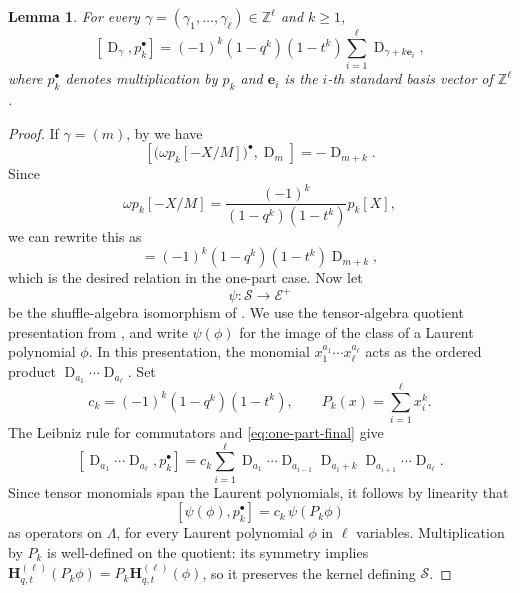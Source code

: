 \documentclass[reqno]{amsart}
\theoremstyle{plain}
\newtheorem{lemma}[theorem]{Lemma}
\theoremstyle{definition}
\theoremstyle{remark}
\DeclareMathOperator{\D}{D}
\newcommand{\Z}{\mathbb{Z}}
\newcommand{\<}{\langle}
\renewcommand{\>}{\rangle}
\begin{document}
\begin{lemma}
    \label{lem:commutator}
    For every $\gamma=(\gamma_1,\dots,\gamma_\ell)\in\Z^\ell$ and $k\geq 1$,
    \begin{equation}        
        \label{eq:commutator}
        [\D_{\gamma}, p_k^\bullet] = (-1)^k (1-q^k)(1-t^k) \sum_{i=1}^{\ell} \D_{\gamma+k\mathbf{e}_i},
    \end{equation}
    where $p_k^\bullet$ denotes multiplication by $p_k$ and $\mathbf{e}_i$ is the $i$-th standard basis vector of $\Z^\ell$.
\end{lemma}

\begin{proof}
    If $\gamma = (m)$, by \cite[Lemma~3.3.3]{BHMPS2023ShuffleAnyLine} we have
    \[ \left[\bigl(\omega p_k[-X/M]\bigr)^\bullet, \D_m \right] = -\D_{m+k}. \]
    Since
    \[ \omega p_k[-X/M] = \frac{(-1)^k}{(1-q^k)(1-t^k)} p_k[X], \]
    we can rewrite this as
    \begin{equation}
        [\D_m, p_k^\bullet] = (-1)^k (1-q^k)(1-t^k) \D_{m+k}, \label{eq:one-part-final}
    \end{equation}
    which is the desired relation in the one-part case. Now let
    \[ \psi \colon \mathcal{S} \longrightarrow \mathcal{E}^+ \]
    be the shuffle-algebra isomorphism of \cite[Proposition~3.5.1]{BHMPS2023ShuffleAnyLine}. We use the tensor-algebra quotient presentation from \cite[Section~3.5]{BHMPS2023ShuffleAnyLine}, and write $\psi(\phi)$ for the image of the class of a Laurent polynomial $\phi$. In this presentation, the monomial $x_1^{a_1}\cdots x_\ell^{a_\ell}$ acts as the ordered product $\D_{a_1}\cdots\D_{a_\ell}$. Set
    \[ c_k=(-1)^k(1-q^k)(1-t^k),\qquad P_k(x)=\sum_{i=1}^\ell x_i^k. \]
    The Leibniz rule for commutators and \eqref{eq:one-part-final} give
    \[
        [\D_{a_1}\cdots\D_{a_\ell},p_k^\bullet]
        =c_k\sum_{i=1}^\ell
        \D_{a_1}\cdots\D_{a_{i-1}}\D_{a_i+k}\D_{a_{i+1}}\cdots\D_{a_\ell}.
    \]
    Since tensor monomials span the Laurent polynomials, it follows by linearity that
    \[ [\psi(\phi),p_k^\bullet]=c_k\,\psi(P_k\phi) \]
    as operators on $\Lambda$, for every Laurent polynomial $\phi$ in $\ell$ variables. Multiplication by $P_k$ is well-defined on the quotient: its symmetry implies
    $\mathbf H_{q,t}^{(\ell)}(P_k\phi)=P_k\mathbf H_{q,t}^{(\ell)}(\phi)$, so it preserves the kernel defining $\mathcal S$.


\end{proof}
\end{document}
